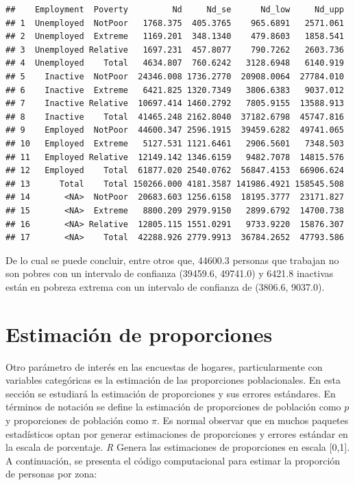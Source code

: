\documentclass[
  12pt,
]{book}
\begin{document}
\begin{verbatim}
##    Employment  Poverty         Nd     Nd_se      Nd_low     Nd_upp
## 1  Unemployed  NotPoor   1768.375  405.3765    965.6891   2571.061
## 2  Unemployed  Extreme   1169.201  348.1340    479.8603   1858.541
## 3  Unemployed Relative   1697.231  457.8077    790.7262   2603.736
## 4  Unemployed    Total   4634.807  760.6242   3128.6948   6140.919
## 5    Inactive  NotPoor  24346.008 1736.2770  20908.0064  27784.010
## 6    Inactive  Extreme   6421.825 1320.7349   3806.6383   9037.012
## 7    Inactive Relative  10697.414 1460.2792   7805.9155  13588.913
## 8    Inactive    Total  41465.248 2162.8040  37182.6798  45747.816
## 9    Employed  NotPoor  44600.347 2596.1915  39459.6282  49741.065
## 10   Employed  Extreme   5127.531 1121.6461   2906.5601   7348.503
## 11   Employed Relative  12149.142 1346.6159   9482.7078  14815.576
## 12   Employed    Total  61877.020 2540.0762  56847.4153  66906.624
## 13      Total    Total 150266.000 4181.3587 141986.4921 158545.508
## 14       <NA>  NotPoor  20683.603 1256.6158  18195.3777  23171.827
## 15       <NA>  Extreme   8800.209 2979.9150   2899.6792  14700.738
## 16       <NA> Relative  12805.115 1551.0291   9733.9220  15876.307
## 17       <NA>    Total  42288.926 2779.9913  36784.2652  47793.586
\end{verbatim}

De lo cual se puede concluir, entre otros que, 44600.3 personas que trabajan no son pobres con un intervalo de confianza (39459.6, 49741.0) y 6421.8 inactivas están en pobreza extrema con un intervalo de confianza de (3806.6, 9037.0).

\hypertarget{estimaciuxf3n-de-proporciones}{%
\section{Estimación de proporciones}\label{estimaciuxf3n-de-proporciones}}

Otro parámetro de interés en las encuestas de hogares, particularmente con variables categóricas es la estimación de las proporciones poblacionales. En esta sección se estudiará la estimación de proporciones y sus errores estándares. En términos de notación se define la estimación de proporciones de población como \(p\) y proporciones de población como \(\pi\). Es normal observar que en muchos paquetes estadísticos optan por generar estimaciones de proporciones y errores estándar en la escala de porcentaje. \emph{R} Genera las estimaciones de proporciones en escala {[}0,1{]}. A continuación, se presenta el código computacional para estimar la proporción de personas por zona:
\end{document}
